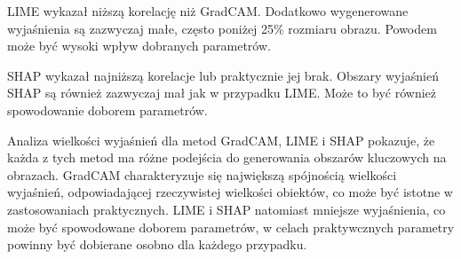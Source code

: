 LIME wykazał niższą korelację niż GradCAM.
Dodatkowo wygenerowane wyjaśnienia są zazwyczaj małe, często poniżej 25\% rozmiaru obrazu.
Powodem może być wysoki wpływ dobranych parametrów.

SHAP wykazał najniższą korelacje lub praktycznie jej brak.
Obszary wyjaśnień SHAP są również zazwyczaj mał jak w przypadku LIME.
Może to być również spowodowanie doborem parametrów.

\vspace{1cm}
Analiza wielkości wyjaśnień dla metod GradCAM, LIME i SHAP pokazuje, że każda z tych metod ma różne podejścia do generowania obszarów kluczowych na obrazach.
GradCAM charakteryzuje się największą spójnością wielkości wyjaśnień, odpowiadającej rzeczywistej wielkości obiektów, co może być istotne w zastosowaniach praktycznych.
LIME i SHAP natomiast mniejsze wyjaśnienia, co może być spowodowane doborem parametrów, w celach praktywcznych parametry powinny być dobierane osobno dla każdego przypadku.


